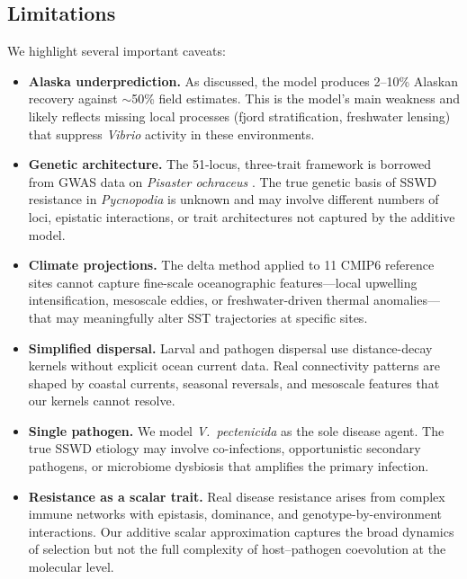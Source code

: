 \subsection{Limitations}

We highlight several important caveats:

\begin{itemize}
  \item \textbf{Alaska underprediction.}  As discussed, the model
    produces 2--10\% Alaskan recovery against ${\sim}$50\% field
    estimates.  This is the model's main weakness and likely reflects
    missing local processes (fjord stratification, freshwater lensing)
    that suppress \textit{Vibrio} activity in these environments.

  \item \textbf{Genetic architecture.}  The 51-locus, three-trait
    framework is borrowed from GWAS data on \textit{Pisaster ochraceus}
    \citep{schiebelhut2018}.  The true genetic basis of SSWD resistance
    in \textit{Pycnopodia} is unknown and may involve different numbers
    of loci, epistatic interactions, or trait architectures not captured
    by the additive model.

  \item \textbf{Climate projections.}  The delta method applied to 11
    CMIP6 reference sites cannot capture fine-scale oceanographic
    features---local upwelling intensification, mesoscale eddies, or
    freshwater-driven thermal anomalies---that may meaningfully alter
    SST trajectories at specific sites.

  \item \textbf{Simplified dispersal.}  Larval and pathogen dispersal
    use distance-decay kernels without explicit ocean current data.
    Real connectivity patterns are shaped by coastal currents, seasonal
    reversals, and mesoscale features that our kernels cannot resolve.

  \item \textbf{Single pathogen.}  We model \textit{V.\ pectenicida}
    as the sole disease agent.  The true SSWD etiology may involve
    co-infections, opportunistic secondary pathogens, or microbiome
    dysbiosis that amplifies the primary infection.

  \item \textbf{Resistance as a scalar trait.}  Real disease resistance
    arises from complex immune networks with epistasis, dominance, and
    genotype-by-environment interactions.  Our additive scalar
    approximation captures the broad dynamics of selection but not the
    full complexity of host--pathogen coevolution at the molecular level.
\end{itemize}

